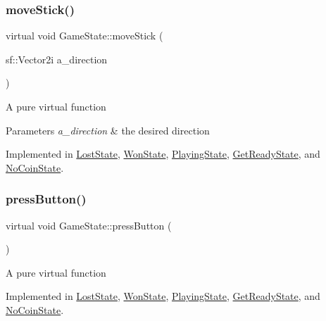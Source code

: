 \mbox{\label{class_game_state_aaae8c1b3ae6969eb2dd81bfc12fbf43f}} 
\subsubsection{\texorpdfstring{move\+Stick()}{moveStick()}}
{\footnotesize\ttfamily virtual void Game\+State\+::move\+Stick (\begin{DoxyParamCaption}\item[{sf\+::\+Vector2i}]{a\+\_\+direction }\end{DoxyParamCaption})\hspace{0.3cm}{\ttfamily [pure virtual]}}

A pure virtual function


\begin{DoxyParams}{Parameters}
{\em a\+\_\+direction} & the desired direction \\
\hline
\end{DoxyParams}


Implemented in \hyperlink{class_lost_state_abc978a14604451eee5e0373b4ad374c8}{Lost\+State}, \hyperlink{class_won_state_a56b272d25511e6a302136d308648464b}{Won\+State}, \hyperlink{class_playing_state_af205fbb130a2c83b260d80359de914e8}{Playing\+State}, \hyperlink{class_get_ready_state_a0a7f1548b4c58e8bd5634ceb59ba7b9b}{Get\+Ready\+State}, and \hyperlink{class_no_coin_state_a9fe8f36082705e6f5833244890093adc}{No\+Coin\+State}.

\mbox{\label{class_game_state_aa14eeaf244bcf19b7013af75cb722dde}} 
\subsubsection{\texorpdfstring{press\+Button()}{pressButton()}}
{\footnotesize\ttfamily virtual void Game\+State\+::press\+Button (\begin{DoxyParamCaption}{ }\end{DoxyParamCaption})\hspace{0.3cm}{\ttfamily [pure virtual]}}

A pure virtual function 

Implemented in \hyperlink{class_lost_state_ab0ec749961cfe909dc61289d14444a71}{Lost\+State}, \hyperlink{class_won_state_ab17f101d9ab90e60259e28b8775a76ec}{Won\+State}, \hyperlink{class_playing_state_ae59ff244a6cd4a3c6f6fcaef41f4d8c5}{Playing\+State}, \hyperlink{class_get_ready_state_a414a505ec783b1bf577b1b859abaee46}{Get\+Ready\+State}, and \hyperlink{class_no_coin_state_a47dd2924ce9601b45ee11e0d9b8452f7}{No\+Coin\+State}.

